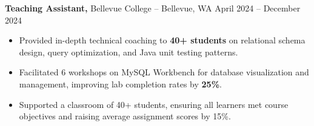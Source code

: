 \documentclass[11pt]{article}       %
\begin{document}

\textbf{Teaching Assistant,} {Bellevue College} -- Bellevue, WA \hfill April 2024 -- December 2024 \\
\vspace{-9pt}
\begin{itemize}
  \item Provided in-depth technical coaching to \textbf{40+ students} on relational schema design, query optimization, and Java unit testing patterns.
  \item Facilitated 6 workshops on MySQL Workbench for database visualization and management, improving lab completion rates by \textbf{25\%}.
  \item Supported a classroom of 40+ students, ensuring all learners met course objectives and raising average assignment scores by 15\%.
\end{itemize}
\end{document}
